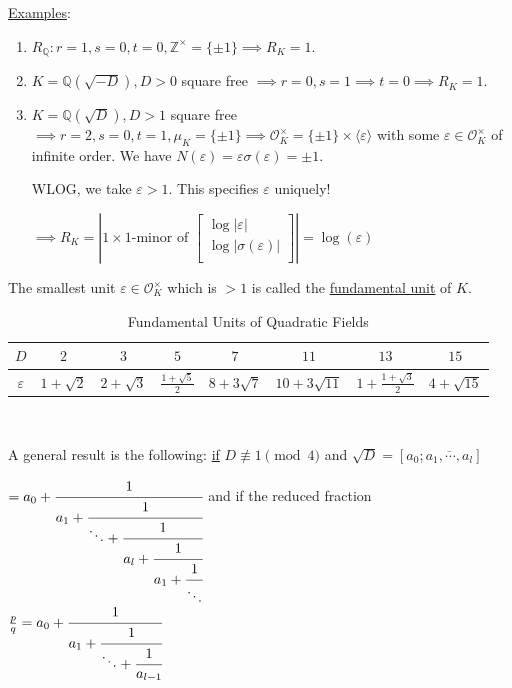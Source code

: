 \documentclass[openany]{amsbook}
\numberwithin{section}{chapter}
\theoremstyle{definition}
\begin{document}
\underline{Examples}: \begin{enumerate}[label=\arabic*)]
    \item  \(R_\mathbb{Q} : r = 1, s=0, t=0, \mathbb{Z}^\times = \{ \pm 1 \} \implies  R_K = 1\).
    \item \(K = \mathbb{Q} (\sqrt{-D}), D>0\) square free \(\implies r = 0, s = 1 \implies t = 0 \implies R_K = 1\).
    \item \(K = \mathbb{Q}(\sqrt{D}), D > 1\) square free \(\implies r = 2, s = 0, t = 1, \mu_K = \{ \pm 1 \} \implies \mathcal{O}_K^\times = \{ \pm 1 \} \times \langle \varepsilon \rangle\) with some \(\varepsilon \in \mathcal{O}_K^\times\) of infinite order. We have \(N(\varepsilon) = \varepsilon \sigma(\varepsilon) = \pm 1\).
    
    WLOG, we take \(\varepsilon > 1\). This specifies \(\varepsilon\) uniquely!

    \(\implies R_K = \left\vert 1 \times 1 \text{-minor of } \begin{bmatrix}
         \log \vert \varepsilon \vert  \\
         \log \vert \sigma (\varepsilon) \vert  \\
    \end{bmatrix} \right\vert = \log (\varepsilon)\) 
\end{enumerate} 

The smallest unit \(\varepsilon \in \mathcal{O}_K^\times\) which is \(> 1\) is called the \underline{fundamental unit} of \(K\).

\begin{table}[H]
    \centering
    \begin{tabular}{|c|c|c|c|c|c|c|c|}
        \toprule
            \(D\) & \(2\) & \(3\) & \(5\) & \(7\) & \(11\) & \(13\) & \(15\) \\
        \midrule
            \(\varepsilon\) & \(1+\sqrt{2}\) & \(2+\sqrt{3}\) & \(\frac{1+\sqrt{5}}{2}\) & \(8+3\sqrt{7}\) & \(10+3\sqrt{11}\) & \(1+\frac{1+\sqrt{3}}{2}\) & \(4+\sqrt{15}\)   \\
        \bottomrule
    \end{tabular}
    \caption{Fundamental Units of Quadratic Fields}
    \label{tab:funit}
\end{table}\(\) 

A general result is the following: \underline{if} \(D \not\equiv 1 \pmod 4\) and \(\sqrt{D} = [a_0; \overline{a_1, \cdots , a_l}]\)

\(= a_0 + \cfrac{1}{a_1 + \cfrac{1}{\ddots + \cfrac{1}{a_l+ \cfrac{1}{a_1 + \cfrac{1}{\ddots}}}}}\) and if the reduced fraction \(\frac{p}{q} = a_0 + \cfrac{1}{a_1 + \cfrac{1}{\ddots + \cfrac{1}{a_{l-1}}}}\) 
\end{document}
